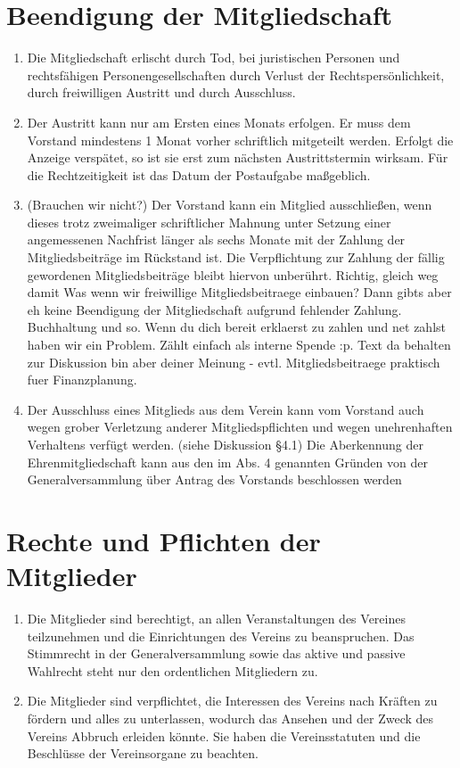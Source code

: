 \documentclass[a4paper,12pt]{article}
\begin{document}
\section{Beendigung der Mitgliedschaft} %
\begin{enumerate}
\item Die Mitgliedschaft erlischt durch Tod, bei juristischen Personen und rechtsfähigen Personengesellschaften durch Verlust der Rechtspersönlichkeit, durch freiwilligen Austritt und durch Ausschluss.
\item Der Austritt kann nur am Ersten eines Monats erfolgen. Er muss dem Vorstand mindestens 1 Monat vorher schriftlich mitgeteilt werden. Erfolgt die Anzeige verspätet, so ist sie erst zum nächsten Austrittstermin wirksam. Für die Rechtzeitigkeit ist das Datum der Postaufgabe maßgeblich.
\item (Brauchen wir nicht?) Der Vorstand kann ein Mitglied ausschließen, wenn dieses trotz zweimaliger schriftlicher Mahnung unter Setzung einer angemessenen Nachfrist länger als sechs Monate mit der Zahlung der Mitgliedsbeiträge im Rückstand ist. Die Verpflichtung zur Zahlung der fällig gewordenen Mitgliedsbeiträge bleibt hiervon unberührt. Richtig, gleich weg damit Was wenn wir freiwillige Mitgliedsbeitraege einbauen? Dann gibts aber eh keine Beendigung der Mitgliedschaft aufgrund fehlender Zahlung. Buchhaltung und so. Wenn du dich bereit erklaerst zu zahlen und net zahlst haben wir ein Problem. Zählt einfach als interne Spende :p. Text da behalten zur Diskussion bin aber deiner Meinung - evtl. Mitgliedsbeitraege praktisch fuer Finanzplanung.
\item Der Ausschluss eines Mitglieds aus dem Verein kann vom Vorstand auch wegen grober Verletzung anderer Mitgliedspflichten und wegen unehrenhaften Verhaltens verfügt werden.
(siehe Diskussion §4.1) Die Aberkennung der Ehrenmitgliedschaft kann aus den im Abs. 4 genannten Gründen von der Generalversammlung über Antrag des Vorstands beschlossen werden
\end{enumerate}

\section{Rechte und Pflichten der Mitglieder} %
\begin{enumerate}
\item Die Mitglieder sind berechtigt, an allen Veranstaltungen des Vereines teilzunehmen und die Einrichtungen des Vereins zu beanspruchen. Das Stimmrecht in der Generalversammlung sowie das aktive und passive Wahlrecht steht nur den ordentlichen Mitgliedern zu.
\item Die Mitglieder sind verpflichtet, die Interessen des Vereins nach Kräften zu fördern und alles zu unterlassen, wodurch das Ansehen und der Zweck des Vereins Abbruch erleiden könnte. Sie haben die Vereinsstatuten und die Beschlüsse der Vereinsorgane zu beachten.
\end{enumerate}
\end{document}
